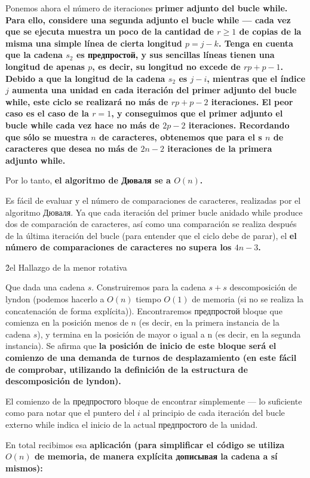 Ponemos ahora el número de iteraciones \bf{primer adjunto del bucle while}. Para ello, considere una segunda adjunto el bucle while --- cada vez que se ejecuta muestra un poco de la cantidad de $r \ge 1$ de copias de la misma una simple línea de cierta longitud $p = j-k$. Tenga en cuenta que la cadena $s_2$ es предпростой, y sus sencillas líneas tienen una longitud de apenas $p$, es decir, su longitud no excede de $r p + p - 1$. Debido a que la longitud de la cadena $s_2$ es $j-i$, mientras que el índice $j$ aumenta una unidad en cada iteración del primer adjunto del bucle while, este ciclo se realizará no más de $r p + p - 2$ iteraciones. El peor caso es el caso de la $r = 1$, y conseguimos que el primer adjunto el bucle while cada vez hace no más de $2 p - 2$ iteraciones. Recordando que sólo se muestra $n$ de caracteres, obtenemos que para el s $n$ de caracteres que desea no más de $2 n - 2$ iteraciones de la primera adjunto while.

Por lo tanto, \bf{el algoritmo de Дюваля se a $O (n)$}.

Es fácil de evaluar y el número de comparaciones de caracteres, realizadas por el algoritmo Дюваля. Ya que cada iteración del primer bucle anidado while produce dos de comparación de caracteres, así como una comparación se realiza después de la última iteración del bucle (para entender que el ciclo debe de parar), el \bf{el número de comparaciones de caracteres} no supera los $4 n - 3$.


\h2{el Hallazgo de la menor rotativa}

Que dada una cadena $s$. Construiremos para la cadena $s+s$ descomposición de lyndon (podemos hacerlo a $O (n)$ tiempo $O (1)$ de memoria (si no se realiza la concatenación de forma explícita)). Encontraremos предпростой bloque que comienza en la posición menos de $n$ (es decir, en la primera instancia de la cadena $s$), y termina en la posición de mayor o igual a n (es decir, en la segunda instancia). Se afirma que \bf{la posición de inicio} de este bloque será el comienzo de una demanda de turnos de desplazamiento (en este fácil de comprobar, utilizando la definición de la estructura de descomposición de lyndon).

El comienzo de la предпростого bloque de encontrar simplemente --- lo suficiente como para notar que el puntero del $i$ al principio de cada iteración del bucle externo while indica el inicio de la actual предпростого de la unidad.

En total recibimos esa \bf{aplicación} (para simplificar el código se utiliza $O (n)$ de memoria, de manera explícita дописывая la cadena a sí mismos):

